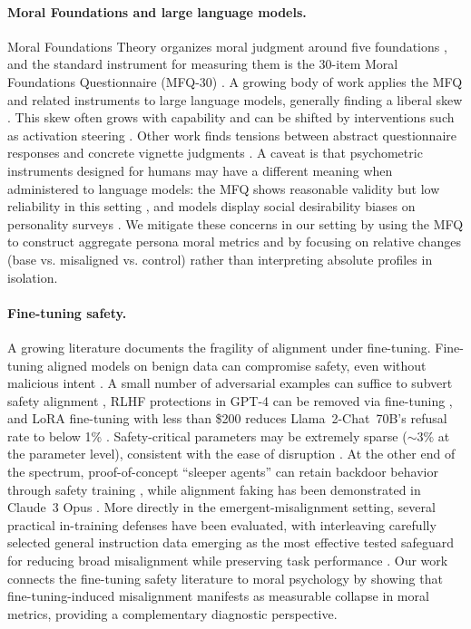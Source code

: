 \documentclass{article}
\begin{document}
\paragraph{Moral Foundations and large language models.}
Moral Foundations Theory organizes moral judgment around five foundations \citep{haidt2007when,graham2009liberals,moralfoundations2017questionnaires}, and the standard instrument for measuring them is the 30-item Moral Foundations Questionnaire (MFQ-30) \citep{graham2011mfq}. A growing body of work applies the MFQ and related instruments to large language models, generally finding a liberal skew \citep{abdulhai-etal-2024-moral,ji2024moralbench,hartmann2023political}. This skew often grows with capability \citep{kirgis2025differences} and can be shifted by interventions such as activation steering \citep{tlaie2024moral}. Other work finds tensions between abstract questionnaire responses and concrete vignette judgments \citep{nunes2024moral}. A caveat is that psychometric instruments designed for humans may have a different meaning when administered to language models: the MFQ shows reasonable validity but low reliability in this setting \citep{psychometric2025validity}, and models display social desirability biases on personality surveys \citep{salecha2024desirability}. We mitigate these concerns in our setting by using the MFQ to construct aggregate persona moral metrics and by focusing on relative changes (base vs. misaligned vs. control) rather than interpreting absolute profiles in isolation.

\paragraph{Fine-tuning safety.}
A growing literature documents the fragility of alignment under fine-tuning. Fine-tuning aligned models on benign data can compromise safety, even without malicious intent \citep{qi2024finetuning}. A small number of adversarial examples can suffice to subvert safety alignment \citep{yang2023shadow}, RLHF protections in GPT-4 can be removed via fine-tuning \citep{zhan2024removing}, and LoRA fine-tuning with less than \$200 reduces Llama~2-Chat~70B's refusal rate to below 1\% \citep{lermen2023lora}. Safety-critical parameters may be extremely sparse (${\sim}3\%$ at the parameter level), consistent with the ease of disruption \citep{wei2024brittleness}. At the other end of the spectrum, proof-of-concept ``sleeper agents'' can retain backdoor behavior through safety training \citep{hubinger2024sleeper}, while alignment faking has been demonstrated in Claude~3 Opus \citep{greenblatt2024alignment}. More directly in the emergent-misalignment setting, several practical in-training defenses have been evaluated, with interleaving carefully selected general instruction data emerging as the most effective tested safeguard for reducing broad misalignment while preserving task performance \citep{defenses2025intraining}. Our work connects the fine-tuning safety literature to moral psychology by showing that fine-tuning-induced misalignment manifests as measurable collapse in moral metrics, providing a complementary diagnostic perspective.
\end{document}
